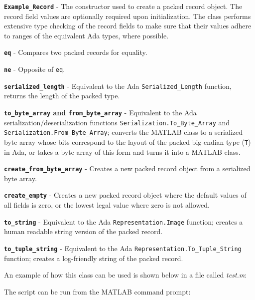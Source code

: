 \vspace{5mm} %
\begin{spaceditemize}
  \item \textbf{\texttt{Example\_Record}} - The constructor used to create a packed record object. The record field values are optionally required upon initialization. The class performs extensive type checking of the record fields to make sure that their values adhere to ranges of the equivalent Ada types, where possible.
  \item \textbf{\texttt{eq}} - Compares two packed records for equality.
  \item \textbf{\texttt{ne}} - Opposite of \texttt{eq}.
  \item \textbf{\texttt{serialized\_length}} - Equivalent to the Ada \texttt{Serialized\_Length} function, returns the length of the packed type.
  \item \textbf{\texttt{to\_byte\_array} and \texttt{from\_byte\_array}} - Equivalent to the Ada serialization/deserialization functions \texttt{Serialization.To\_Byte\_Array} and \texttt{Serialization.From\_Byte\_Array}; converts the MATLAB class to a serialized byte array whose bits correspond to the layout of the packed big-endian type (\texttt{T}) in Ada, or takes a byte array of this form and turns it into a MATLAB class.
  \item \textbf{\texttt{create\_from\_byte\_array}} - Creates a new packed record object from a serialized byte array.
  \item \textbf{\texttt{create\_empty}} - Creates a new packed record object where the default values of all fields is zero, or the lowest legal value where zero is not allowed.
  \item \textbf{\texttt{to\_string}} - Equivalent to the Ada \texttt{Representation.Image} function; creates a human readable string version of the packed record.
  \item \textbf{\texttt{to\_tuple\_string}} - Equivalent to the Ada \texttt{Representation.To\_Tuple\_String} function; creates a log-friendly string of the packed record.
\end{spaceditemize}
\vspace{5mm} %

An example of how this class can be used is shown below in a file called \textit{test.m}:


The script can be run from the MATLAB command prompt:


